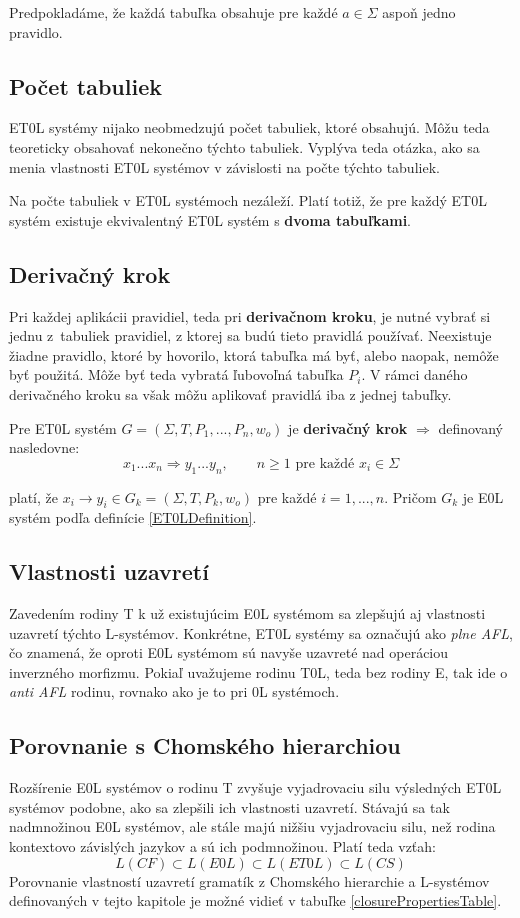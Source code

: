 Predpokladáme, že každá tabuľka obsahuje pre každé $ a \in \Sigma $ aspoň jedno pravidlo.

\subsection*{Počet tabuliek}
ET0L systémy nijako neobmedzujú počet tabuliek, ktoré obsahujú. Môžu teda teoreticky obsahovať nekonečno týchto tabuliek. Vyplýva teda otázka, ako sa menia vlastnosti ET0L systémov v závislosti na počte týchto tabuliek.

Na počte tabuliek v ET0L systémoch nezáleží. Platí totiž, že pre každý ET0L systém existuje ekvivalentný ET0L systém s \textbf{dvoma tabuľkami}\cite{handbook}.

\subsection*{Derivačný krok}
Pri každej aplikácii pravidiel, teda pri \textbf{derivačnom kroku}, je nutné vybrať si jednu z~tabuliek pravidiel, z ktorej sa budú tieto pravidlá používať. Neexistuje žiadne pravidlo, ktoré by hovorilo, ktorá tabuľka má byť, alebo naopak, nemôže byť použitá. Môže byť teda vybratá ľubovoľná tabuľka $P_i$. V rámci daného derivačného kroku sa však môžu aplikovať pravidlá iba z jednej tabuľky.

\begin{definition}
Pre ET0L systém $G = (\Sigma, T, P_1, ..., P_n, w_o)$  je \textbf{derivačný krok} $\Rightarrow$ definovaný nasledovne:
\[x_1...x_n \Rightarrow y_1...y_n, \quad\quad n\geq1 \text{ pre každé } x_i \in \Sigma \]

platí, že $x_i \to y_i \in G_k = (\Sigma, T, P_k, w_o)$ pre každé $i = 1,...,n$. Pričom $G_k$ je E0L systém podľa definície \ref{ET0LDefinition}.
\end{definition}

\subsection*{Vlastnosti uzavretí}
Zavedením rodiny T k už existujúcim E0L systémom sa zlepšujú aj vlastnosti uzavretí týchto L-systémov. Konkrétne, ET0L systémy sa označujú ako \textit{plne AFL}, čo znamená, že oproti E0L systémom sú navyše uzavreté nad operáciou inverzného morfizmu. Pokiaľ uvažujeme rodinu T0L, teda bez rodiny E, tak ide o \textit{anti AFL} rodinu, rovnako ako je to pri 0L systémoch\cite{handbook}.

\subsection*{Porovnanie s Chomského hierarchiou}
Rozšírenie E0L systémov o rodinu T zvyšuje vyjadrovaciu silu výsledných ET0L systémov podobne, ako sa zlepšili ich vlastnosti uzavretí. Stávajú sa tak nadmnožinou E0L systémov, ale stále majú nižšiu vyjadrovaciu silu, než rodina kontextovo závislých jazykov a sú ich podmnožinou. Platí teda vzťah:
\[L(CF) \subset L(E0L) \subset L(ET0L) \subset L(CS)\]
Porovnanie vlastností uzavretí gramatík z Chomského hierarchie a L-systémov definovaných v tejto kapitole je možné vidieť v tabuľke \ref{closurePropertiesTable}.

